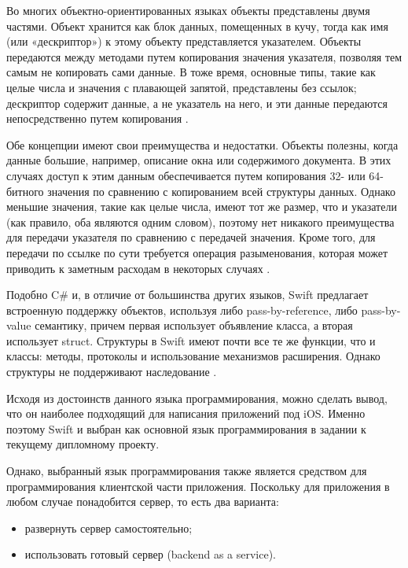 Во многих объектно-ориентированных языках объекты представлены двумя частями. Объект хранится как блок данных, помещенных в кучу, тогда как имя (или «дескриптор») к этому объекту представляется указателем. Объекты передаются между методами путем копирования значения указателя, позволяя тем самым не копировать сами данные. В тоже время, основные типы, такие как целые числа и значения с плавающей запятой, представлены без ссылок; дескриптор содержит данные, а не указатель на него, и эти данные передаются непосредственно путем копирования \cite{swift_doc}.

Обе концепции имеют свои преимущества и недостатки. Объекты полезны, когда данные большие, например, описание окна или содержимого документа. В этих случаях доступ к этим данным обеспечивается путем копирования 32- или 64-битного значения по сравнению с копированием всей структуры данных. Однако меньшие значения, такие как целые числа, имеют тот же размер, что и указатели (как правило, оба являются одним словом), поэтому нет никакого преимущества для передачи указателя по сравнению с передачей значения. Кроме того, для передачи по ссылке по сути требуется операция разыменования, которая может приводить к заметным расходам в некоторых случаях \cite{swift_doc}.

Подобно C\# и, в отличие от большинства других языков, Swift предлагает встроенную поддержку объектов, используя либо pass-by-reference, либо pass-by-value семантику, причем первая использует объявление класса, а вторая использует struct. Структуры в Swift имеют почти все те же функции, что и классы: методы, протоколы и использование механизмов расширения. Однако структуры не поддерживают наследование \cite{msdn_charp}.

Исходя из достоинств данного языка программирования, можно сделать вывод, что он наиболее подходящий для написания приложений под iOS. Именно поэтому Swift и выбран как основной язык программирования в задании к текущему дипломному проекту.

Однако, выбранный язык программирования также является средством для программирования клиентской части приложения. Поскольку для приложения в любом случае понадобится сервер, то есть два варианта: 

\begin{itemize}
	\item развернуть сервер самостоятельно;
	\item использовать готовый сервер (backend as a service).
\end{itemize}

